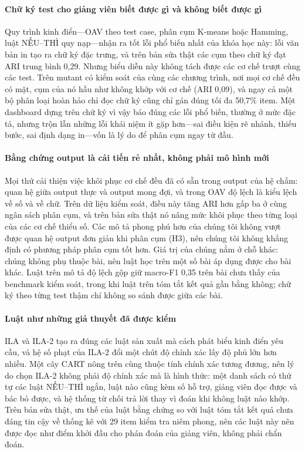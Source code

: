\documentclass[a4paper,preprint,12pt,authoryear]{elsarticle}
\begin{document}
\paragraph{Chữ ký test cho giảng viên biết được gì và không biết được gì}
Quy trình kinh điển---OAV theo test case, phân cụm K-means hoặc Hamming, luật NẾU--THÌ quy nạp---nhận ra tốt lỗi phổ biến nhất của khóa học này: lỗi văn bản in tạo ra chữ ký đặc trưng, và trên bản sửa thật các cụm theo chữ ký đạt ARI trung bình 0,29. Nhưng biểu diễn này không tách được các cơ chế trượt cùng các test. Trên mutant có kiểm soát của cùng các chương trình, nơi mọi cơ chế đều có mặt, cụm của nó hầu như không khớp với cơ chế (ARI 0,09), và ngay cả một bộ phân loại hoàn hảo chỉ đọc chữ ký cũng chỉ gán đúng tối đa 50,7\% item. Một dashboard dựng trên chữ ký vì vậy báo đúng các lỗi phổ biến, thường ở mức đặc tả, nhưng trộn lẫn những lỗi khái niệm ít gặp hơn---sai điều kiện rẽ nhánh, thiếu bước, sai định dạng in---vốn là lý do để phân cụm ngay từ đầu.

\paragraph{Bằng chứng output là cải tiến rẻ nhất, không phải mô hình mới}
Mọi thứ cải thiện việc khôi phục cơ chế đều đã có sẵn trong output của hệ chấm: quan hệ giữa output thực và output mong đợi, và trong OAV độ lệch là kiểu lệch về số và về chữ. Trên dữ liệu kiểm soát, điều này tăng ARI hơn gấp ba ở cùng ngân sách phân cụm, và trên bản sửa thật nó nâng mức khôi phục theo từng loại của các cơ chế thiểu số. Các mô tả phong phú hơn của chúng tôi không vượt được quan hệ output đơn giản khi phân cụm (H3), nên chúng tôi không khẳng định có phương pháp phân cụm tốt hơn. Giá trị của chúng nằm ở chỗ khác: chúng không phụ thuộc bài, nên luật học trên một số bài áp dụng được cho bài khác. Luật trên mô tả độ lệch gộp giữ macro-F1 0,35 trên bài chưa thấy của benchmark kiểm soát, trong khi luật trên tóm tắt kết quả gần bằng không; chữ ký theo từng test thậm chí không so sánh được giữa các bài.

\paragraph{Luật như những giả thuyết đã được kiểm}
ILA và ILA-2 tạo ra đúng các luật sản xuất mà cách phát biểu kinh điển yêu cầu, và hệ số phạt của ILA-2 đổi một chút độ chính xác lấy độ phủ lớn hơn nhiều. Một cây CART nông trên cùng thuộc tính chính xác tương đương, nên lý do chọn ILA-2 không phải độ chính xác mà là hình thức: một danh sách có thứ tự các luật NẾU--THÌ ngắn, luật nào cũng kèm số hỗ trợ, giảng viên đọc được và bác bỏ được, và hệ thống từ chối trả lời thay vì đoán khi không luật nào khớp. Trên bản sửa thật, ưu thế của luật bằng chứng so với luật tóm tắt kết quả chưa đáng tin cậy về thống kê với 29 item kiểm tra niêm phong, nên các luật này nên được đọc như điểm khởi đầu cho phán đoán của giảng viên, không phải chẩn đoán.
\end{document}
